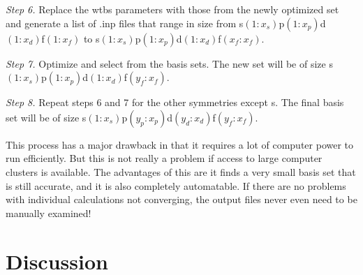 \documentclass[12pt]{book}
\begin{document}
\textit{Step 6.} Replace the wtbs parameters with those from the newly optimized set and generate a list of .inp files that range in size from s$(1:x_{s})$p$(1:x_{p})$d$(1:x_{d})$f$(1:x_{f})$ to s$(1:x_{s})$p$(1:x_{p})$d$(1:x_{d})$f$(x_{f}:x_{f})$.

\textit{Step 7.} Optimize and select from the basis sets. The new set will be of size s$(1:x_{s})$p$(1:x_{p})$d$(1:x_{d})$f$(y_{f}:x_{f})$.

\textit{Step 8.} Repeat steps 6 and 7 for the other symmetries except s. The final basis set will be of size s$(1:x_{s})$p$(y_{p}:x_{p})$d$(y_{d}:x_{d})$f$(y_{f}:x_{f})$.

This process has a major drawback in that it requires a lot of computer power to run efficiently. But this is not really a problem if access to large computer clusters is available. The advantages of this are it finds a very small basis set that is still accurate, and it is also completely automatable. If there are no problems with individual calculations not converging, the output files never even need to be manually examined!

\section{Discussion}
\end{document}

